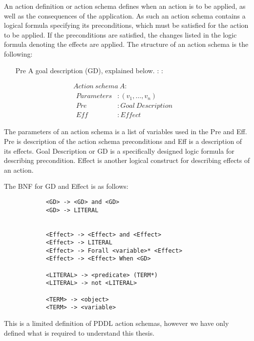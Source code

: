 \documentclass[../Master.tex]{subfiles}
\begin{document}
\begin{definition} \label{def:lrn:action-spec-def}
		An action definition or action schema defines when an action is to be applied, as well as the consequences of the application. As such an action schema contains a logical formula specifying its preconditions, which must be satisfied for the action to be applied. If the preconditions are satisfied, the changes listed in the logic formula denoting the effects are applied. The structure of an action schema is the following:
	\begin{itemize}
        \item[Pre] A goal description (GD), explained below. : :
    \end{itemize}
    \begin{equation*}
		\begin{array}{ll}
		Action~schema~A: & \\
		
		\begin{array}{ll}
		Parameters & : (v_1,\dots,v_n) \\  
		Pre	& : Goal~Description \\
		Eff & : Effect 
		\end{array}
		\end{array}
    \end{equation*}

	The parameters of an action schema is a list of variables used in the Pre and Eff. Pre is description of the action schema preconditions and Eff is a description of its effects. 
    Goal Description or GD is a specifically designed logic formula for describing precondition. Effect is another logical construct for describing effects of an action.

		The BNF for GD and Effect is as follows:
		
		\begin{lstlisting}
            <GD> -> <GD> and <GD>
            <GD> -> LITERAL
            
            
            <Effect> -> <Effect> and <Effect>
            <Effect> -> LITERAL
            <Effect> -> Forall <variable>* <Effect> 
            <Effect> -> <Effect> When <GD>
            
            <LITERAL> -> <predicate> (TERM*)
            <LITERAL> -> not <LITERAL>
            
            <TERM> -> <object>
            <TERM> -> <variable>
		\end{lstlisting}
		
		This is a limited definition of PDDL action schemas, however we have only defined what is required to understand this thesis.
	\end{definition}
	
\end{document}

